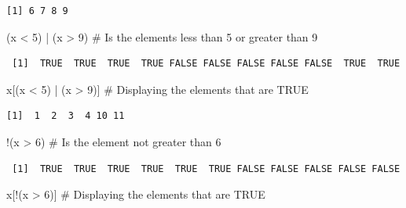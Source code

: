 \documentclass[
  letterpaper,
  DIV=11,
  numbers=noendperiod]{scrreprt}
\newenvironment{Shaded}{\begin{snugshade}}{\end{snugshade}}
\newcommand{\CommentTok}[1]{\textcolor[rgb]{0.37,0.37,0.37}{#1}}
\newcommand{\DecValTok}[1]{\textcolor[rgb]{0.68,0.00,0.00}{#1}}
\newcommand{\NormalTok}[1]{\textcolor[rgb]{0.00,0.23,0.31}{#1}}
\newcommand{\SpecialCharTok}[1]{\textcolor[rgb]{0.37,0.37,0.37}{#1}}
\begin{document}
\begin{verbatim}
[1] 6 7 8 9
\end{verbatim}

\begin{Shaded}
\begin{Highlighting}[]
\NormalTok{(x }\SpecialCharTok{\textless{}} \DecValTok{5}\NormalTok{) }\SpecialCharTok{|}\NormalTok{ (x }\SpecialCharTok{\textgreater{}} \DecValTok{9}\NormalTok{) }\CommentTok{\# Is the elements less than 5 or greater than 9}
\end{Highlighting}
\end{Shaded}

\begin{verbatim}
 [1]  TRUE  TRUE  TRUE  TRUE FALSE FALSE FALSE FALSE FALSE  TRUE  TRUE
\end{verbatim}

\begin{Shaded}
\begin{Highlighting}[]
\NormalTok{x[(x }\SpecialCharTok{\textless{}} \DecValTok{5}\NormalTok{) }\SpecialCharTok{|}\NormalTok{ (x }\SpecialCharTok{\textgreater{}} \DecValTok{9}\NormalTok{)] }\CommentTok{\# Displaying the elements that are TRUE}
\end{Highlighting}
\end{Shaded}

\begin{verbatim}
[1]  1  2  3  4 10 11
\end{verbatim}

\begin{Shaded}
\begin{Highlighting}[]
\SpecialCharTok{!}\NormalTok{(x }\SpecialCharTok{\textgreater{}} \DecValTok{6}\NormalTok{) }\CommentTok{\# Is the element not greater than 6}
\end{Highlighting}
\end{Shaded}

\begin{verbatim}
 [1]  TRUE  TRUE  TRUE  TRUE  TRUE  TRUE FALSE FALSE FALSE FALSE FALSE
\end{verbatim}

\begin{Shaded}
\begin{Highlighting}[]
\NormalTok{x[}\SpecialCharTok{!}\NormalTok{(x }\SpecialCharTok{\textgreater{}} \DecValTok{6}\NormalTok{)] }\CommentTok{\# Displaying the elements that are TRUE}
\end{Highlighting}
\end{Shaded}
\end{document}
